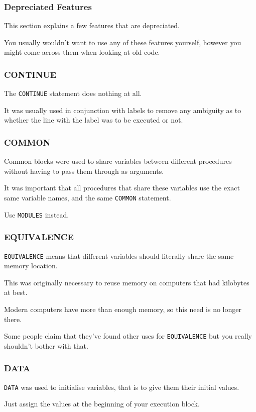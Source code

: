 \begin{frame}[fragile]
  \frametitle{Depreciated Features}

  This section explains a few features that are depreciated.

  You usually wouldn't want to use any of these features yourself, 
  however you might come across them when looking at old code.

\end{frame}

\begin{frame}[fragile]
  \frametitle{CONTINUE}

  The \texttt{CONTINUE} statement does nothing at all.

  It was usually used in conjunction with labels to remove any ambiguity
  as to whether the line with the label was to be executed or not.

\end{frame}

\begin{frame}[fragile]
  \frametitle{COMMON}

  Common blocks were used to share variables between different procedures without
  having to pass them through as arguments.

  It was important that all procedures that share these variables use the exact
  same variable names, and the same \texttt{COMMON} statement.

  Use \texttt{MODULES} instead.

\end{frame}

\begin{frame}[fragile]
  \frametitle{EQUIVALENCE}

  \texttt{EQUIVALENCE} means that different variables should literally
  share the same memory location.

  This was originally necessary to reuse memory on computers that had kilobytes 
  at best. 

  Modern computers have more than enough memory, so this need is no longer there.

  Some people claim that they've found other uses for \texttt{EQUIVALENCE} but you
  really shouldn't bother with that.

\end{frame}

\begin{frame}[fragile]
  \frametitle{DATA}

  \texttt{DATA} was used to initialise variables, that is to give them their initial values.

  Just assign the values at the beginning of your execution block.

\end{frame}

